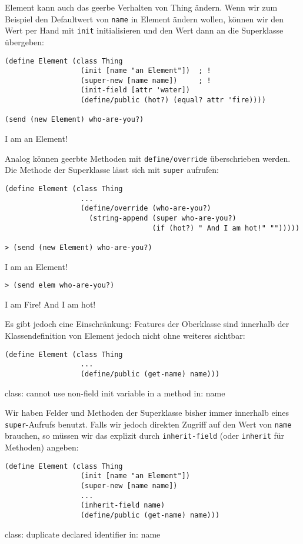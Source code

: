 Element kann auch das geerbe Verhalten von Thing ändern. Wenn wir zum Beispiel den Defaultwert von \texttt{name} in Element ändern wollen, können wir den Wert per Hand mit \texttt{init} initialisieren und den Wert dann an die Superklasse übergeben:

\begin{lstlisting}
(define Element (class Thing 
                  (init [name "an Element"])  ; !
                  (super-new [name name])     ; !
                  (init-field [attr 'water])
                  (define/public (hot?) (equal? attr 'fire))))
  
(send (new Element) who-are-you?)
\end{lstlisting}
{\routput {\qq}I am an Element!\qq}

Analog können geerbte Methoden mit \texttt{define/override} überschrieben werden. Die Methode der Superklasse lässt sich mit \texttt{super} aufrufen:

\begin{lstlisting}
(define Element (class Thing 
                  ...
                  (define/override (who-are-you?)
                    (string-append (super who-are-you?)
                                   (if (hot?) " And I am hot!" "")))))
                                   
> (send (new Element) who-are-you?)
\end{lstlisting}
{\routput {\qq}I am an Element!\qq}

\begin{lstlisting}
> (send elem who-are-you?)
\end{lstlisting}
{\routput {\qq}I am Fire! And I am hot!\qq}

Es gibt jedoch eine Einschränkung: Features der Oberklasse sind innerhalb der Klassendefinition von Element jedoch nicht ohne weiteres sichtbar: 

\begin{lstlisting}
(define Element (class Thing 
                  ...
                  (define/public (get-name) name)))
\end{lstlisting}
{\rerror class: cannot use non-field init variable in a method in: name}

Wir haben Felder und Methoden der Superklasse bisher immer innerhalb eines \texttt{super}-Aufrufs benutzt. Falls wir jedoch direkten Zugriff auf den Wert von \texttt{name} brauchen, so müssen wir das explizit durch \texttt{inherit-field} (oder \texttt{inherit} für Methoden) angeben:

\begin{lstlisting}
(define Element (class Thing 
                  (init [name "an Element"])
                  (super-new [name name])
                  ...
                  (inherit-field name)
                  (define/public (get-name) name)))
\end{lstlisting}
{\rerror  class: duplicate declared identifier in: name}


